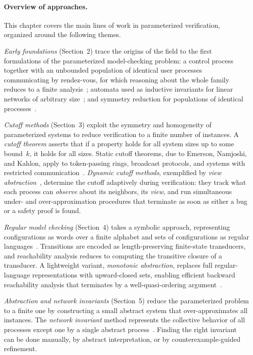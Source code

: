 \paragraph{Overview of approaches.}
This chapter covers the main lines of work in parameterized verification,
organized around the following themes.

\emph{Early foundations} (Section~2) trace the origins of the field to the
first formulations of the parameterized model-checking problem: a control
process together with an unbounded population of identical user processes
communicating by rendez-vous, for which reasoning about the whole family
reduces to a finite analysis~\cite{GerSis92}; automata used as inductive
invariants for linear networks of arbitrary size~\cite{SisGyu99}; and symmetry
reduction for populations of identical processes~\cite{EmeSis96,GyuSis97}.

\emph{Cutoff methods} (Section~3) exploit the symmetry and homogeneity of
parameterized systems to reduce verification to a finite number of instances.
A \emph{cutoff theorem} asserts that if a property holds for all system sizes
up to some bound~$k$, it holds for all sizes. Static cutoff theorems, due to
Emerson, Namjoshi, and Kahlon, apply to token-passing rings, broadcast
protocols, and systems with restricted communication~\cite{EN95,EK03}.
\emph{Dynamic cutoff methods}, exemplified by \emph{view
abstraction}~\cite{AHH13,AHH16}, determine the cutoff adaptively during
verification: they track what each process can \emph{observe} about its
neighbors, its \emph{view}, and run simultaneous under- and
over-approximation procedures that terminate as soon as either a bug or a
safety proof is found.

\emph{Regular model checking} (Section~4) takes a symbolic approach,
representing configurations as words over a finite alphabet and sets of
configurations as regular languages~\cite{KW01,BW98}. Transitions are encoded
as length-preserving finite-state transducers, and reachability analysis
reduces to computing the transitive closure of a transducer. A lightweight
variant, \emph{monotonic abstraction}, replaces full regular-language
representations with upward-closed sets, enabling efficient backward
reachability analysis that terminates by a well-quasi-ordering
argument~\cite{Abd10}.

\emph{Abstraction and network invariants} (Section~5) reduce the parameterized
problem to a finite one by constructing a small abstract system that
over-approximates all instances. The \emph{network invariant} method
represents the collective behavior of all processes except one by a single
abstract process~\cite{WL89,PXZ02}. Finding the right invariant can be done
manually, by abstract interpretation, or by counterexample-guided refinement.

